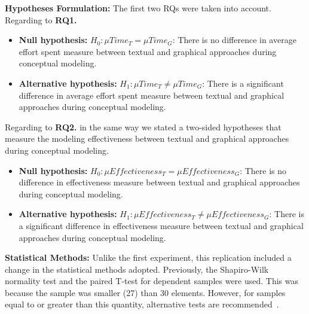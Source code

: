 \textbf{Hypotheses Formulation:} 
The first two RQs were taken into account. Regarding to \textbf{RQ1.} 
\begin{itemize}
    \item \textbf{Null hypothesis:} $H_0 : \mu Time_T = \mu Time_G$: There is no difference in average effort spent measure between textual and graphical approaches during conceptual modeling.
    \item \textbf{Alternative hypothesis:} $H_{1} : \mu Time_T \neq \mu Time_G$: There is a significant difference in average effort spent measure between textual and graphical approaches during conceptual modeling.
\end{itemize}
Regarding to \textbf{RQ2.} 
in the same way we stated a two-sided hypotheses that measure the modeling effectiveness between textual and graphical approaches during conceptual modeling.
\begin{itemize}
    \item \textbf{Null hypothesis:} $H_0 : \mu Effectiveness_T = \mu Effectiveness_G$: There is no difference in effectiveness measure between textual and graphical approaches during conceptual modeling.
    \item \textbf{Alternative hypothesis:} $H_{1} : \mu Effectiveness_T \neq \mu Effectiveness_G$: There is a significant difference in effectiveness measure between textual and graphical approaches during conceptual modeling.
\end{itemize}

\textbf{Statistical Methods:} Unlike the first experiment, this replication included a change in the statistical methods adopted.
Previously, the Shapiro-Wilk normality test and the paired T-test for dependent samples were used.
This was because the sample was smaller (27) than 30 elements.
However, for samples equal to or greater than this quantity, alternative tests are recommended~\cite{Triola:2018}.

